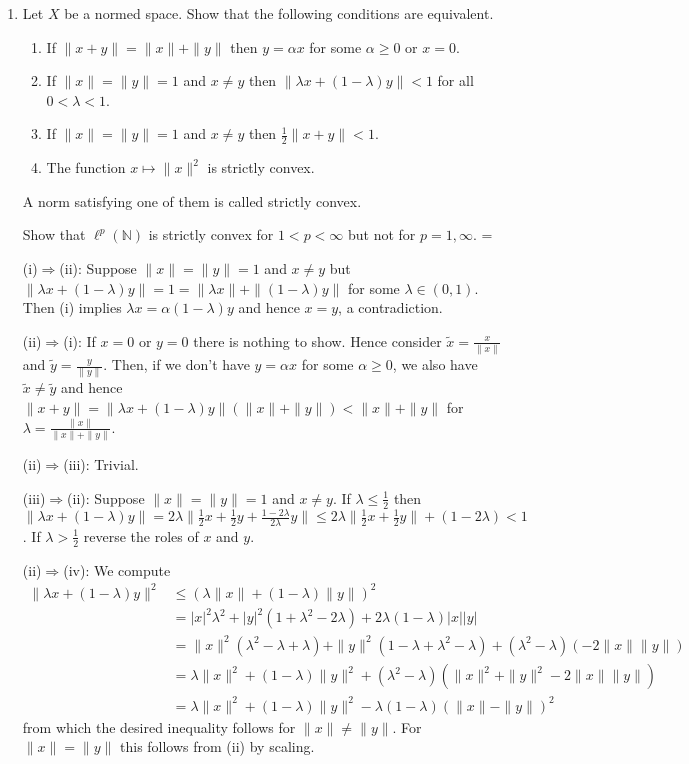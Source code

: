 \documentclass[a4paper]{article}
\makeatletter
\newcommand{\ti}{\tilde}
\newcommand{\lam}{\lambda}
\newcommand{\N}{{\mathbb N}}
\newif\ifsolutions
\newenvironment{solution}%
{%
\ifsolutions\par\noindent\color{gray}\normalfont\textbf{Solution.}
\else\setbox0=\vbox\bgroup\color@begingroup\fi
}{%
\ifsolutions
\else\color@endgroup\egroup\fi
}%
\makeatother
\begin{document}
\begin{enumerate}
\item\label{pr:strconv}
Let $X$ be a normed space. Show that the following conditions are equivalent.
\begin{enumerate}
\item If $\|x+y\|=\|x\|+\|y\|$ then $y=\alpha x$ for some $\alpha\ge 0$ or $x=0$.
\item If $\|x\|=\|y\|=1$ and $x\ne y$ then $\|\lam x + (1-\lam) y\| < 1$ for all $0<\lam<1$.
\item If $\|x\|=\|y\|=1$ and $x\ne y$ then $\frac{1}{2}\|x + y\| < 1$.
\item The function $x\mapsto \|x\|^2$ is strictly convex.
\end{enumerate}
A norm satisfying one of them is called strictly convex.

Show that $\ell^p(\N)$ is strictly convex for $1<p<\infty$ but not for $p=1,\infty$.
\begin{solution}
(i)$\Rightarrow$(ii): Suppose $\|x\|=\|y\|=1$ and $x\ne y$ but $\|\lam x + (1-\lam) y\| =1 =\|\lam x\| + \|(1-\lam) y\|$ for some $\lam\in(0,1)$. Then (i) implies
$\lam x= \alpha (1-\lam)y$ and  hence $x=y$, a contradiction.

(ii)$\Rightarrow$(i): If $x=0$ or $y=0$ there is nothing to show. Hence consider $\ti{x}=\frac{x}{\|x\|}$ and $\ti{y}=\frac{y}{\|y\|}$. Then, if we don't have
$y=\alpha x$ for some $\alpha\ge 0$, we also have $\ti{x}\ne\ti{y}$ and hence $\|x+y\|=\|\lam x + (1-\lam) y\| (\|x\|+\|y\|)< \|x\|+\|y\|$ for $\lam=\frac{\|x\|}{\|x\|+\|y\|}$.

(ii)$\Rightarrow$(iii): Trivial.

(iii)$\Rightarrow$(ii): Suppose $\|x\|=\|y\|=1$ and $x\ne y$. If $\lam\le \frac{1}{2}$ then $\|\lam x + (1-\lam) y\| = 2\lam \|\frac{1}{2} x + \frac{1}{2} y + \frac{1-2\lam}{2\lam}y\|
\le 2\lam \|\frac{1}{2} x + \frac{1}{2} y\| + (1-2\lam) < 1$. If $\lam>\frac{1}{2}$ reverse the roles of $x$ and $y$.

(ii)$\Rightarrow$(iv): We compute
\begin{align*}
\|\lam x + (1-\lam) y\|^2 & \le (\lam \|x\| + (1-\lam) \|y\|)^2\\ & = |x|^2 \lam^2 + |y|^2 (1+\lam^2-2\lam) + 2\lam(1-\lam) |x||y|\\
& = \|x\|^2 (\lam^2 - \lam + \lam) + \|y\|^2 (1-\lam + \lam^2 - \lam) + (\lam^2 - \lam) (-2\|x\|\|y\|) \\
& = \lam \|x\|^2 + (1-\lam) \|y\|^2 + (\lam^2-\lam) ( \|x\|^2 + \|y\|^2 - 2\|x\|\|y\| )\\
&= \lam \|x\|^2 + (1-\lam) \|y\|^2 -\lam(1-\lam) (\|x\|-\|y\|)^2
\end{align*}
from which the desired inequality follows for $\|x\|\ne\|y\|$. For $\|x\|=\|y\|$ this follows from (ii) by scaling.


\end{solution}
\end{enumerate}
\end{document}
